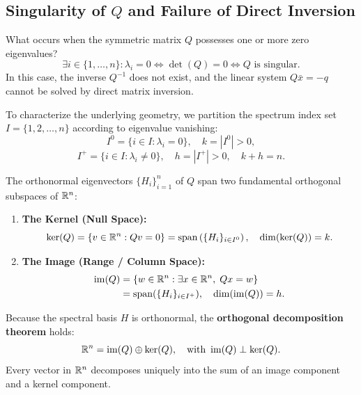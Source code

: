 \subsection{Singularity of \texorpdfstring{$Q$}{Q} and Failure of Direct Inversion}
What occurs when the symmetric matrix $Q$ possesses one or more zero eigenvalues?
\begin{equation}
    \exists i \in \{1, \dots, n\} : \lambda_i = 0 \iff \det(Q) = 0 \iff Q \text{ is singular}.
\end{equation}
In this case, the inverse $Q^{-1}$ does not exist, and the linear system $Q \bar{x} = -q$ cannot be solved by direct matrix inversion.

To characterize the underlying geometry, we partition the spectrum index set $I = \{1, 2, \dots, n\}$ according to eigenvalue vanishing:
\begin{equation}
    I^0 = \{i \in I : \lambda_i = 0\}, \quad k = |I^0| > 0,
\end{equation}
\begin{equation}
    I^+ = \{i \in I : \lambda_i \neq 0\}, \quad h = |I^+| > 0, \quad k + h = n.
\end{equation}

The orthonormal eigenvectors $\{H_i\}_{i=1}^n$ of $Q$ span two fundamental orthogonal subspaces of $\mathbb{R}^n$:
\begin{enumerate}
    \item \textbf{The Kernel (Null Space):}
    \begin{equation}
        \ker(Q) = \{v \in \mathbb{R}^n : Qv = 0\} = \operatorname{span}\left(\{H_i\}_{i \in I^0}\right), \quad \dim(\ker(Q)) = k.
    \end{equation}
    \item \textbf{The Image (Range / Column Space):}
    \begin{align}
        \operatorname{im}(Q) &= \{w \in \mathbb{R}^n : \exists x \in \mathbb{R}^n, \; Qx = w\} \nonumber \\
        &= \operatorname{span}(\{H_i\}_{i \in I^+}), \quad \dim(\operatorname{im}(Q)) = h.
    \end{align}
\end{enumerate}

Because the spectral basis $H$ is orthonormal, the \textbf{orthogonal decomposition theorem} holds:
\begin{equation}
    \mathbb{R}^n = \operatorname{im}(Q) \oplus \ker(Q), \quad \text{with } \operatorname{im}(Q) \perp \ker(Q).
\end{equation}
Every vector in $\mathbb{R}^n$ decomposes uniquely into the sum of an image component and a kernel component.

